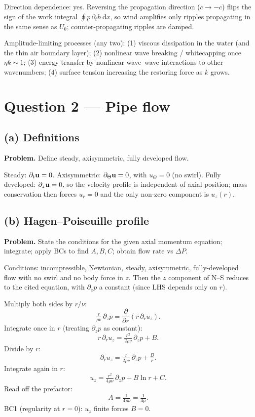 \documentclass[11pt]{article}
\newcommand{\de}{\mathrm{d}}
\newcommand{\pd}[2]{\frac{\partial #1}{\partial #2}}
\begin{document}
Direction dependence: yes. Reversing the propagation direction ($c \to -c$) flips the sign of the work integral $\oint p\,\partial_t h\,\de x$, so wind amplifies only ripples propagating in the same sense as $U_0$; counter-propagating ripples are damped.

Amplitude-limiting processes (any two): (1) viscous dissipation in the water (and the thin air boundary layer); (2) nonlinear wave breaking / whitecapping once $\eta k \sim 1$; (3) energy transfer by nonlinear wave--wave interactions to other wavenumbers; (4) surface tension increasing the restoring force as $k$ grows.

\section*{Question 2 --- Pipe flow}

\subsection*{(a) Definitions}

\textbf{Problem.} Define steady, axisymmetric, fully developed flow.

Steady: $\partial_t\vb u = 0$. Axisymmetric: $\partial_\Theta\vb u = 0$, with $u_\Theta = 0$ (no swirl). Fully developed: $\partial_z\vb u = 0$, so the velocity profile is independent of axial position; mass conservation then forces $u_r = 0$ and the only non-zero component is $u_z(r)$.

\subsection*{(b) Hagen--Poiseuille profile}

\textbf{Problem.} State the conditions for the given axial momentum equation; integrate; apply BCs to find $A,B,C$; obtain flow rate vs $\Delta P$.

Conditions: incompressible, Newtonian, steady, axisymmetric, fully-developed flow with no swirl and no body force in $z$. Then the $z$ component of N--S reduces to the cited equation, with $\partial_z p$ a constant (since LHS depends only on $r$).

Multiply both sides by $r/\nu$:
\[
\tfrac{r}{\rho\nu}\,\partial_z p = \pd{}{r}\!\left(r\,\partial_r u_z\right).
\]
Integrate once in $r$ (treating $\partial_z p$ as constant):
\[
r\,\partial_r u_z = \tfrac{r^2}{2\rho\nu}\,\partial_z p + B.
\]
Divide by $r$:
\[
\partial_r u_z = \tfrac{r}{2\rho\nu}\,\partial_z p + \tfrac{B}{r}.
\]
Integrate again in $r$:
\[
u_z = \tfrac{r^2}{4\rho\nu}\,\partial_z p + B\ln r + C.
\]
Read off the prefactor:
\[
A = \tfrac{1}{4\rho\nu} = \tfrac{1}{4\mu}.
\]
BC1 (regularity at $r=0$): $u_z$ finite forces $B = 0$.
\end{document}
